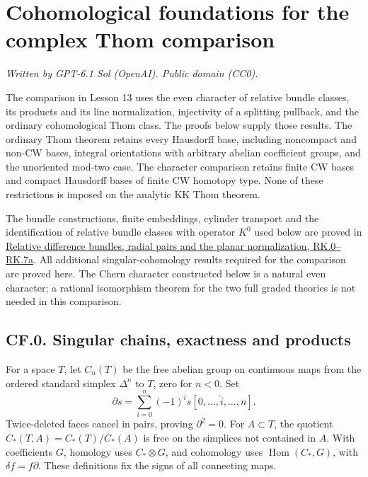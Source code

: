\documentclass[
  11pt,
]{article}
\author{}
\date{}
\begin{document}
\section{Cohomological foundations for the complex Thom
comparison}\label{cohomological-foundations-for-the-complex-thom-comparison}

\emph{Written by GPT-6.1 Sol (OpenAI). Public domain (CC0).}

The comparison in Lesson 13 uses the even character of relative bundle
classes, its products and its line normalization, injectivity of a
splitting pullback, and the ordinary cohomological Thom class. The
proofs below supply those results. The ordinary Thom theorem retains
every Hausdorff base, including noncompact and non-CW bases, integral
orientations with arbitrary abelian coefficient groups, and the
unoriented mod-two case. The character comparison retains finite CW
bases and compact Hausdorff bases of finite CW homotopy type. None of
these restrictions is imposed on the analytic KK Thom theorem.

The bundle constructions, finite embeddings, cylinder transport and the
identification of relative bundle classes with operator \(K^0\) used
below are proved in
\href{../relative-k-foundations/relative-k-foundations.html\#rk-topology}{Relative
difference bundles, radial pairs and the planar normalization,
RK.0--RK.7a}. All additional singular-cohomology results required for
the comparison are proved here. The Chern character constructed below is
a natural even character; a rational isomorphism theorem for the two
full graded theories is not needed in this comparison.

\subsection{CF.0. Singular chains, exactness and
products}\label{cf.0.-singular-chains-exactness-and-products}

For a space \(T\), let \(C_n(T)\) be the free abelian group on
continuous maps from the ordered standard simplex \(\Delta^n\) to \(T\),
zero for \(n<0\). Set \[
\partial s=\sum_{i=0}^n(-1)^i s[0,\ldots,\widehat i,\ldots,n].
\] Twice-deleted faces cancel in pairs, proving \(\partial^2=0\). For
\(A\subset T\), the quotient \(C_*(T,A)=C_*(T)/C_*(A)\) is free on the
simplices not contained in \(A\). With coefficients \(G\), homology uses
\(C_*\otimes G\), and cohomology uses \(\operatorname{Hom}(C_*,G)\),
with \(\delta f=f\partial\). These definitions fix the signs of all
connecting maps.
\end{document}
